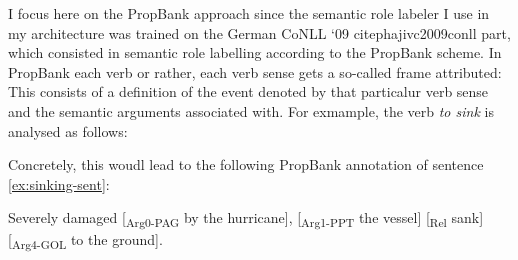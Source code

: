 I focus here on the PropBank approach since the semantic role labeler I use in my architecture
was trained on the German CoNLL `09 citep{hajivc2009conll} part, which consisted in semantic
role labelling according to the PropBank scheme.
In PropBank each verb or rather, each verb sense gets a so-called frame attributed: This consists
of a definition of the event denoted by that particalur verb sense and the semantic arguments
associated with. For exmample, the verb \emph{to sink} is analysed as follows:

\noindent{}

Concretely, this woudl lead to the following PropBank annotation of sentence \ref{ex:sinking-sent}:

\begin{examples}
  \item Severely damaged [\textsubscript{Arg0-PAG} by the hurricane], [\textsubscript{Arg1-PPT} the vessel] [\textsubscript{Rel} sank] [\textsubscript{Arg4-GOL} to the ground].
\end{examples}


